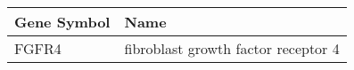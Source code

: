\begin{tabular}{ll}
\toprule
Gene Symbol &                                Name \\
\midrule
      FGFR4 & fibroblast growth factor receptor 4 \\
\bottomrule
\end{tabular}
